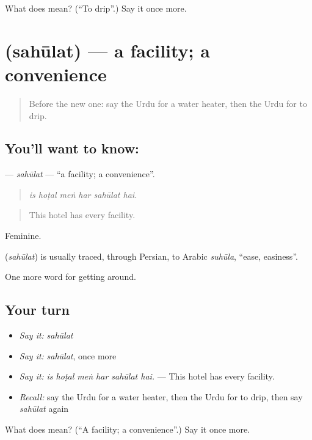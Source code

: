 \begin{tcolorbox}[breakable,colback=teal!4,colframe=teal!35!black,title={Before you move on}]
What does  mean? (\textquotedblleft{}To drip\textquotedblright{}.) Say it once more.
\end{tcolorbox}
\section[\texorpdfstring{\ur{سہولت} (sahūlat)}{سہولت (sahūlat)}]{ (sahūlat) — a facility; a convenience}

\label{lesson:UR-C404-sahulat}



\begin{quote}
Before the new one: say the Urdu for a water heater, then the Urdu for to drip.
\end{quote}

\subsection*{You'll want to know: }
\textbf{} — \emph{sahūlat} — \textquotedblleft{}a facility; a convenience\textquotedblright{}.

\begin{quote}
     
\end{quote}

\begin{quote}
\emph{is hoṭal meṅ har sahūlat hai.}
\end{quote}

\begin{quote}
This hotel has every facility.
\end{quote}

Feminine.

\begin{cousinweb}
\textbf{} (\emph{sahūlat}) is usually traced, through Persian, to Arabic \emph{suhūla}, \textquotedblleft{}ease, easiness\textquotedblright{}.
\end{cousinweb}

\begin{grammarlens}[title={What you've built}]
One more word for getting around.
\end{grammarlens}

\subsection*{Your turn}
\begin{itemize}
\raggedright
  \item \emph{Say it:} \emph{sahūlat}
  \item \emph{Say it:} \emph{sahūlat}, once more
  \item \emph{Say it:} \emph{is hoṭal meṅ har sahūlat hai.} — This hotel has every facility.
  \item \emph{Recall:} say the Urdu for a water heater, then the Urdu for to drip, then say \emph{sahūlat} again
\end{itemize}

\begin{tcolorbox}[breakable,colback=teal!4,colframe=teal!35!black,title={Before you move on}]
What does  mean? (\textquotedblleft{}A facility; a convenience\textquotedblright{}.) Say it once more.
\end{tcolorbox}
